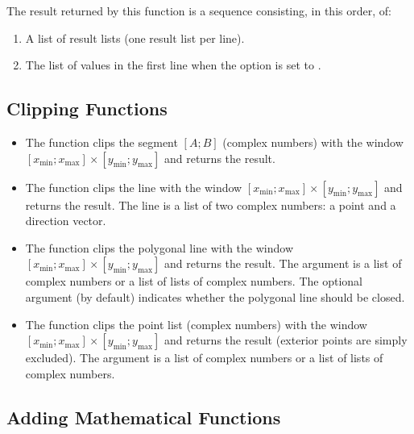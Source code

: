 The result returned by this function is a sequence consisting, in this order, of:
\begin{enumerate}
    \item A list of result lists (one result list per line).
    \item The list of values ​​in the first line when the  option is set to \true.
\end{enumerate}


\subsection{Clipping Functions}

\begin{itemize}
    \item The function  clips the segment $[A;B]$ (complex numbers) with the window $[x_{\mathrm{min}};x_{\mathrm{max}}]\times [y_{\mathrm{min}};y_{\mathrm{max}}]$ and returns the result.

    \item The function  clips the line  with the window $[x_{\mathrm{min}};x_{\mathrm{max}}]\times [y_{\mathrm{min}};y_{\mathrm{max}}]$ and returns the result. The line  is a list of two complex numbers: a point and a direction vector.

    \item The function  clips the polygonal line  with the  window $[x_{\mathrm{min}};x_{\mathrm{max}}]\times [y_{\mathrm{min}};y_{\mathrm{max}}]$ and returns the result. The argument  is a list of complex numbers or a list of lists of complex numbers. The optional argument  (\false by default) indicates whether the polygonal line should be closed.

    \item The function  clips the point list (complex numbers)  with the window $[x_{\mathrm{min}};x_{\mathrm{max}}]\times [y_{\mathrm{min}};y_{\mathrm{max}}]$ and returns the result (exterior points are simply excluded). The argument  is a list of complex numbers or a list of lists of complex numbers.
\end{itemize}

\subsection{Adding Mathematical Functions}

